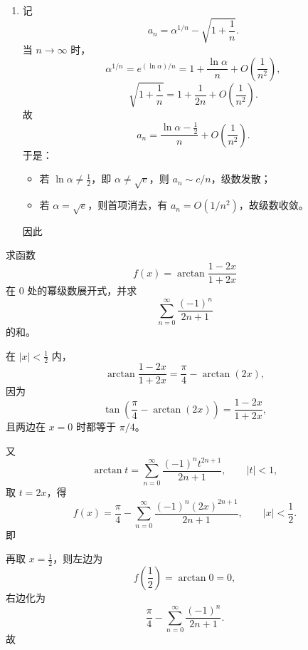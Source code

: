 \begin{question}[含参数级数的敛散性]
\begin{solution}
\begin{enumerate}[label=(\arabic*),leftmargin=2.6em,itemsep=0.25em,topsep=0.2em]
\item 记
\[
a_n=\alpha^{1/n}-\sqrt{1+\frac1n}.
\]
当 $n\to\infty$ 时，
\[
\alpha^{1/n}=e^{(\ln\alpha)/n}
=1+\frac{\ln\alpha}{n}+O\!\left(\frac{1}{n^2}\right),
\]
\[
\sqrt{1+\frac1n}=1+\frac{1}{2n}+O\!\left(\frac{1}{n^2}\right).
\]
故
\[
a_n=\frac{\ln\alpha-\frac12}{n}+O\!\left(\frac{1}{n^2}\right).
\]
于是：
\begin{itemize}[leftmargin=2em,itemsep=0.2em,topsep=0.2em]
\item 若 $\ln\alpha\ne \frac12$，即 $\alpha\ne \sqrt e$，则 $a_n\sim c/n$，级数发散；
\item 若 $\alpha=\sqrt e$，则首项消去，有 $a_n=O(1/n^2)$，故级数收敛。
\end{itemize}
因此
\end{enumerate}
\end{solution}
\end{question}

\begin{question}[幂级数展开与求和]

求函数
\[
f(x)=\arctan\frac{1-2x}{1+2x}
\]
在 $0$ 处的幂级数展开式，并求
\[
\sum_{n=0}^{\infty}\frac{(-1)^n}{2n+1}
\]
的和。

\begin{solution}
在 $|x|<\frac12$ 内，
\[
\arctan\frac{1-2x}{1+2x}=\frac{\pi}{4}-\arctan(2x),
\]
因为
\[
\tan\!\left(\frac{\pi}{4}-\arctan(2x)\right)=\frac{1-2x}{1+2x},
\]
且两边在 $x=0$ 时都等于 $\pi/4$。

又
\[
\arctan t=\sum_{n=0}^{\infty}\frac{(-1)^n t^{2n+1}}{2n+1},
\qquad |t|<1,
\]
取 $t=2x$，得
\[
f(x)=\frac{\pi}{4}-\sum_{n=0}^{\infty}\frac{(-1)^n(2x)^{2n+1}}{2n+1},
\qquad |x|<\frac12.
\]
即

再取 $x=\frac12$，则左边为
\[
f\!\left(\frac12\right)=\arctan 0=0,
\]
右边化为
\[
\frac{\pi}{4}-\sum_{n=0}^{\infty}\frac{(-1)^n}{2n+1}.
\]
故
\end{solution}
\end{question}

